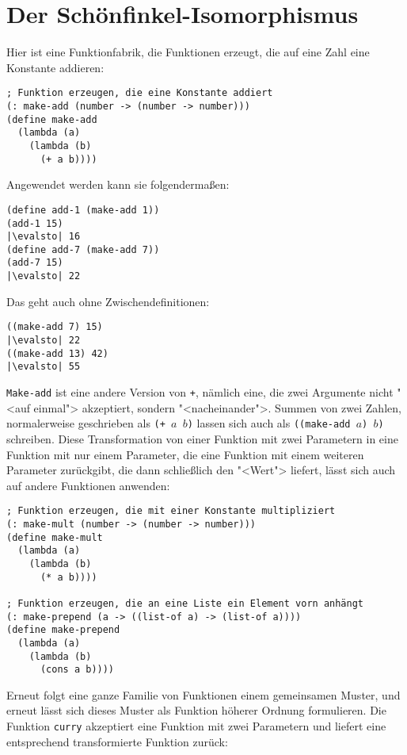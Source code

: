 \section{Der Schönfinkel-Isomorphismus}
\label{sec:currying}
Hier ist eine Funktionfabrik, die Funktionen erzeugt, die auf eine
Zahl eine Konstante addieren:
%
\begin{lstlisting}
; Funktion erzeugen, die eine Konstante addiert
(: make-add (number -> (number -> number)))
(define make-add
  (lambda (a)
    (lambda (b)
      (+ a b))))
\end{lstlisting}
%
Angewendet werden kann sie folgendermaßen:
%
\begin{lstlisting}
(define add-1 (make-add 1))
(add-1 15)
|\evalsto| 16
(define add-7 (make-add 7))
(add-7 15)
|\evalsto| 22
\end{lstlisting}
%
Das geht auch ohne Zwischendefinitionen:
%
\begin{lstlisting}
((make-add 7) 15)
|\evalsto| 22
((make-add 13) 42)
|\evalsto| 55
\end{lstlisting}
%
\texttt{Make-add} ist eine andere Version von \texttt{+}, nämlich
eine, die zwei Argumente nicht "<auf einmal"> akzeptiert, sondern
"<nacheinander">.  Summen von zwei Zahlen, normalerweise geschrieben
als \texttt{(+ $a$ $b$)} lassen sich auch als \texttt{((make-add $a$)
  $b$)} schreiben.  Diese Transformation von einer Funktion mit zwei
Parametern in eine Funktion mit nur einem Parameter, die eine Funktion
mit einem weiteren Parameter zurückgibt, die dann schließlich den "<Wert">
liefert, lässt sich auch auf andere Funktionen anwenden:
%
\begin{lstlisting}
; Funktion erzeugen, die mit einer Konstante multipliziert
(: make-mult (number -> (number -> number)))
(define make-mult
  (lambda (a)
    (lambda (b)
      (* a b))))

; Funktion erzeugen, die an eine Liste ein Element vorn anhängt
(: make-prepend (a -> ((list-of a) -> (list-of a))))
(define make-prepend
  (lambda (a)
    (lambda (b)
      (cons a b))))
\end{lstlisting}
%
Erneut folgt eine ganze Familie von Funktionen einem gemeinsamen
Muster, und erneut lässt sich dieses Muster als Funktion höherer
Ordnung formulieren.  Die Funktion \texttt{curry} akzeptiert
eine Funktion mit zwei Parametern und liefert eine entsprechend
transformierte Funktion zurück:
